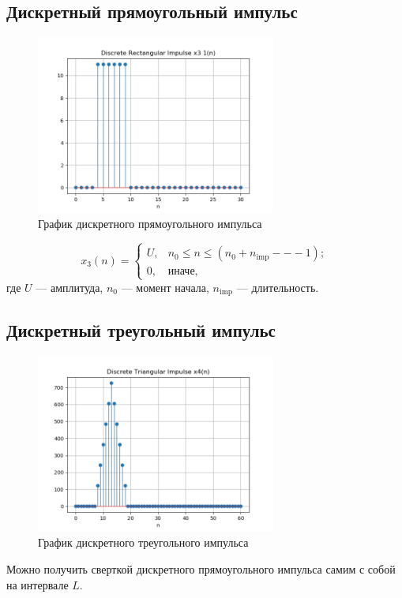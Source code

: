 \documentclass[a4paper, 14pt]{extarticle}
\begin{document}
\subsection{Дискретный прямоугольный импульс}
\begin{figure}[h]
    \centering
    \includegraphics[width=0.7\textwidth]{img/signals/6.png}
    \caption{График дискретного прямоугольного импульса}%
\end{figure}
\begin{equation}
    x_3 (n) = \begin{cases}
        U, &n_0 \le n \le (n_0 + n_\text{imp} --- 1 );\\
        0, &\text{иначе},
    \end{cases}
\end{equation}
где $U$ --- амплитуда, $n_0$ --- момент начала, $n_\text{imp} $ --- длительность.

\clearpage
\subsection{Дискретный треугольный импульс}
\begin{figure}[h]
    \centering
    \includegraphics[width=0.7\textwidth]{img/signals/7.png}
    \caption{График дискретного треугольного импульса}
\end{figure}
Можно получить сверткой дискретного прямоугольного импульса самим с собой на интервале $L$.
\end{document}
